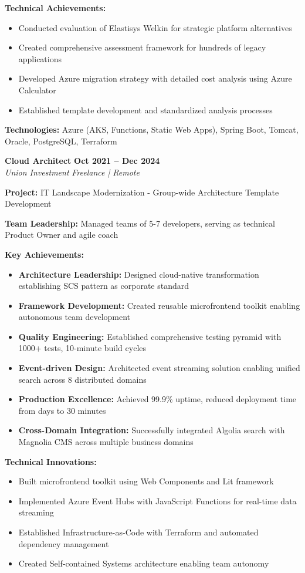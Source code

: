 \documentclass[11pt,a4paper]{article}
\newcommand{\jobheader}[4]{%
    \textbf{\large #1} \hfill \textbf{#2} \\
    \textit{#3} \hfill \textit{#4}
}
\begin{document}
\textbf{Technical Achievements:}
\begin{itemize}[leftmargin=*,noitemsep,topsep=0pt]
\item Conducted evaluation of Elastisys Welkin for strategic platform alternatives
\item Created comprehensive assessment framework for hundreds of legacy applications
\item Developed Azure migration strategy with detailed cost analysis using Azure Calculator
\item Established template development and standardized analysis processes
\end{itemize}

\textbf{Technologies:} Azure (AKS, Functions, Static Web Apps), Spring Boot, Tomcat, Oracle, PostgreSQL, Terraform

\vspace{1em}

\jobheader{Cloud Architect}{Oct 2021 -- Dec 2024}{Union Investment}{Freelance | Remote}

\textbf{Project:} IT Landscape Modernization - Group-wide Architecture Template Development

\textbf{Team Leadership:} Managed teams of 5-7 developers, serving as technical Product Owner and agile coach

\textbf{Key Achievements:}
\begin{itemize}[leftmargin=*,noitemsep,topsep=0pt]
\item \textbf{Architecture Leadership:} Designed cloud-native transformation establishing SCS pattern as corporate standard
\item \textbf{Framework Development:} Created reusable microfrontend toolkit enabling autonomous team development
\item \textbf{Quality Engineering:} Established comprehensive testing pyramid with 1000+ tests, 10-minute build cycles
\item \textbf{Event-driven Design:} Architected event streaming solution enabling unified search across 8 distributed domains
\item \textbf{Production Excellence:} Achieved 99.9\% uptime, reduced deployment time from days to 30 minutes
\item \textbf{Cross-Domain Integration:} Successfully integrated Algolia search with Magnolia CMS across multiple business domains
\end{itemize}

\textbf{Technical Innovations:}
\begin{itemize}[leftmargin=*,noitemsep,topsep=0pt]
\item Built microfrontend toolkit using Web Components and Lit framework
\item Implemented Azure Event Hubs with JavaScript Functions for real-time data streaming
\item Established Infrastructure-as-Code with Terraform and automated dependency management
\item Created Self-contained Systems architecture enabling team autonomy
\end{itemize}
\end{document}
